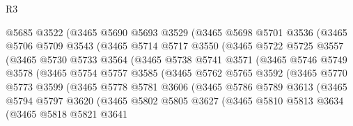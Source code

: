 \begin{lexlean}{R3}
\begin{coremodule}
              @5685
              @3522
              (@3465
                @5690
                @5693
                @3529
                (@3465
                  @5698
                  @5701
                  @3536
                  (@3465
                    @5706
                    @5709
                    @3543
                    (@3465
                      @5714
                      @5717
                      @3550
                      (@3465
                        @5722
                        @5725
                        @3557
                        (@3465
                          @5730
                          @5733
                          @3564
                          (@3465
                            @5738
                            @5741
                            @3571
                            (@3465
                              @5746
                              @5749
                              @3578
                              (@3465
                                @5754
                                @5757
                                @3585
                                (@3465
                                  @5762
                                  @5765
                                  @3592
                                  (@3465
                                    @5770
                                    @5773
                                    @3599
                                    (@3465
                                      @5778
                                      @5781
                                      @3606
                                      (@3465
                                        @5786
                                        @5789
                                        @3613
                                        (@3465
                                          @5794
                                          @5797
                                          @3620
                                          (@3465
                                            @5802
                                            @5805
                                            @3627
                                            (@3465
                                              @5810
                                              @5813
                                              @3634
                                              (@3465
                                                @5818
                                                @5821
                                                @3641

\end{coremodule}
\end{lexlean}
